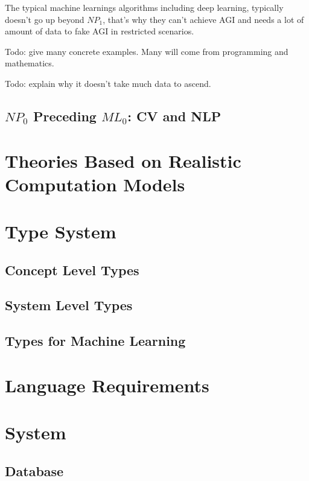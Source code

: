 \documentclass[9pt, oneside]{article}   	%
\theoremstyle{definition}
\begin{document}
The typical machine learnings algorithms including deep learning, typically doesn't go up beyond $NP_1$, that's why they can't achieve AGI and needs a lot of amount of data to fake AGI in restricted scenarios.

Todo: give many concrete examples. Many will come from programming and mathematics.

Todo: explain why it doesn't take much data to ascend.

\subsection{$NP_0$ Preceding $ML_0$: CV and NLP}


\section{Theories Based on Realistic Computation Models}



\section{Type System}

\subsection{Concept Level Types}


\subsection{System Level Types}

\subsection{Types for Machine Learning}

\section{Language Requirements}

\section{System}

\subsection{Database}
\end{document}
